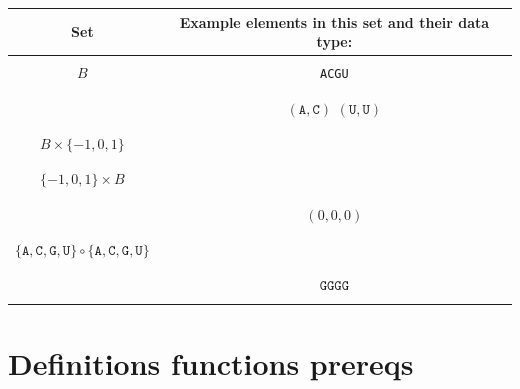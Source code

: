 \documentclass[12pt, oneside]{article}
\newcommand{\A}[0]{\texttt{A}}
\newcommand{\C}[0]{\texttt{C}}
\newcommand{\G}[0]{\texttt{G}}
\newcommand{\U}[0]{\texttt{U}}
\begin{document}
\begin{center}
\begin{tabular}{cc}
{\bf  Set} & {\bf Example elements in this set and their data type}:\\
\hline 
& \\
$B$ &\A \qquad \C \qquad \G \qquad \U \\
& \\
\hline
& \\
\phantom{$B \times B$} & $(\A, \C)$ \qquad $(\U, \U)$\\
& \\
\hline
& \\
$B \times \{-1,0,1\}$ & \\
& \\
\hline
& \\
$\{-1,0,1\} \times B$ & \\
& \\
\hline
& \\
\phantom{$\{-1,0,1\} \times \{-1,0,1\}  \times \{-1,0,1\} $} & \qquad $(0,0,0)$ \\
& \\
\hline
& \\
$ \{\A, \C, \G, \U \} \circ  \{\A, \C, \G, \U \}$& \\
& \\
\hline
& \\
\phantom{$\{G\} \circ \{G\} \circ \{G\}$} & \qquad $\G\G\G\G$ \\
& \\
\hline

\end{tabular}
\end{center}

\vfill \vfill
\section*{Definitions functions prereqs}
\end{document}
